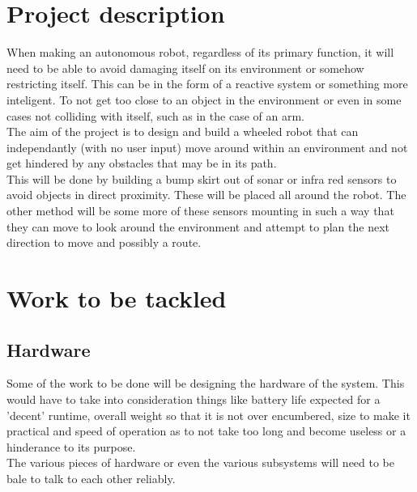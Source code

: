 \documentclass[11pt,fleqn,twoside]{article}
\begin{document}

\mmp

\setcounter{tocdepth}{3} %


\section{Project description}
When making an autonomous robot, regardless of its primary function, it will need to be able to avoid damaging itself on its environment or somehow restricting itself.  This can be in the form of a reactive system or something more inteligent.  To not get too close to an object in the environment or even in some cases not colliding with itself, such as in the case of an arm.
\\The aim of the project is to design and build a wheeled robot that can independantly (with no user input) move around within an environment and not get hindered by any obstacles that may be in its path.
\\This will be done by building a bump skirt out of sonar or infra red sensors to avoid objects in direct proximity.  These will be placed all around the robot.  The other method will be some more of these sensors mounting in such a way that they can move to look around the environment and attempt to plan the next direction to move and possibly a route.
\section{Work to be tackled}
\subsection{Hardware}
Some of the work to be done will be designing the hardware of the system.  This would have to take into consideration things like battery life expected for a 'decent' runtime, overall weight so that it is not over encumbered, size to make it practical and speed of operation as to not take too long and become useless or a hinderance to its purpose.
\\The various pieces of hardware or even the various subsystems will need to be bale to talk to each other reliably.
\end{document}
